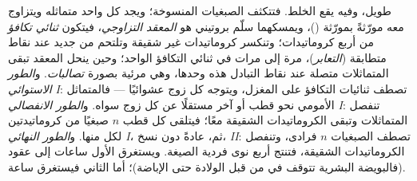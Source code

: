 \begin{proposition}[المراحل]\label{prop:b2:meiosis-heredity:stages}
\emph{} طويل، وفيه يقع الخلط. فتتكثف الصبغيات
المنسوخة؛ ويجد كل واحد متماثله ويتزاوج معه مورّثةً بمورّثة
(\emph{})، ويمسكهما سلّم بروتيني هو \emph{المعقد
التزاوجي}، فيتكون \emph{ثنائي تكافؤ} من أربع كروماتيدات؛ وتنكسر
كروماتيدات غير شقيقة وتلتحم من جديد عند نقاط متطابقة
(\emph{التعابر})، مرة إلى مرات في ثنائي التكافؤ الواحد؛ وحين ينحل
المعقد تبقى المتماثلات متصلة عند نقاط التبادل هذه وحدها، وهي مرئية
بصورة \emph{تصالبات}. و\emph{الطور الاستوائي I}: تصطف ثنائيات
التكافؤ على المغزل، ويتوجه كل زوج عشوائيًا --- فالمتماثل الأمومي
نحو قطب أو آخر مستقلًا عن كل زوج سواه. و\emph{الطور الانفصالي I}:
تنفصل المتماثلات وتبقى الكروماتيدات الشقيقة معًا؛ فيتلقى كل قطب $n$
صبغيًا من كروماتيدتين لكل منها. و\emph{الطور النهائي I}، ثم،
عادةً دون نسخ، \emph{ II}: تصطف الصبغيات $n$ فرادى،
وتنفصل الكروماتيدات الشقيقة، فتنتج أربع نوى فردية الصيغة. ويستغرق
 الأول ساعات إلى عقود (فالبويضة البشرية تتوقف في
 من قبل الولادة حتى الإباضة)؛ أما 
الثاني فيستغرق ساعة.
\end{proposition}

